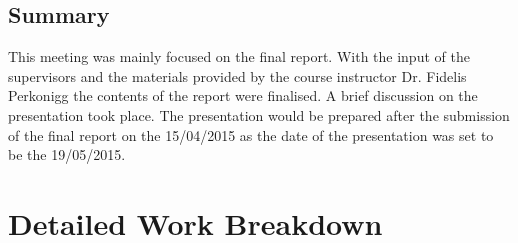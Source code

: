 \documentclass[a4paper,11pt]{article}
\begin{document}
\subsection*{Summary}
This meeting was mainly focused on the final report. With the input of the supervisors and the materials provided by the course instructor Dr. Fidelis Perkonigg the contents of the report were finalised. A brief discussion on the presentation took place. The presentation would be prepared after the submission of the final report on the 15/04/2015 as the date of the presentation was set to be the 19/05/2015.



\clearpage
\section{Detailed Work Breakdown}
\end{document}
